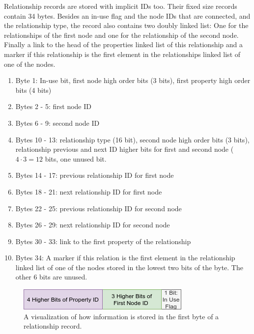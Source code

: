 \documentclass[a4paper,10pt]{article}
\begin{document}
    Relationship records are stored with implicit IDs too. Their fixed size records contain 34 bytes. Besides an in-use flag and the node IDs that are connected, and the relationship type, the record also contains two doubly linked list: One for the relationships of the first node and one for the relationship of the second node. Finally a link to the head of the properties linked list of this relationship and a marker if this relationship is the first element in the relationships linked list of one of the nodes.
    \newpage
    \begin{enumerate}
     \item Byte 1: In-use bit, first node high order bits (3 bits), first property high order bits (4 bits)
     \item Bytes 2 - 5: first node ID 
     \item Bytes 6 - 9: second node ID 
     \item Bytes 10 - 13: relationship type (16 bit), second node high order bits (3 bits), relationship previous and next ID higher bits for first and second node ($4 \cdot 3 = 12$ bits, one unused bit.
     \item Bytes 14 - 17: previous relationship ID for first node
     \item Bytes 18 - 21: next relationship ID for first node
     \item Bytes 22 - 25: previous relationship ID for second node
     \item Bytes 26 - 29: next relationship ID for second node
     \item Bytes 30 - 33: link to the first property of the relationship
     \item Bytes 34: A marker if this relation is the first element in the relationship linked list of one of the nodes stored in the lowest two bits of the byte. The other 6 bits are unused.
    \end{enumerate}


\begin{figure}[htp]\label{rel_first_byte}
 \begin{center}
  \includegraphics[keepaspectratio,width=\textwidth]{img/relationship/relationship_first_byte.png}
 \end{center}
 \caption{A visualization of how information is stored in the first byte of a relationship record.} %
\end{figure}
\end{document}
